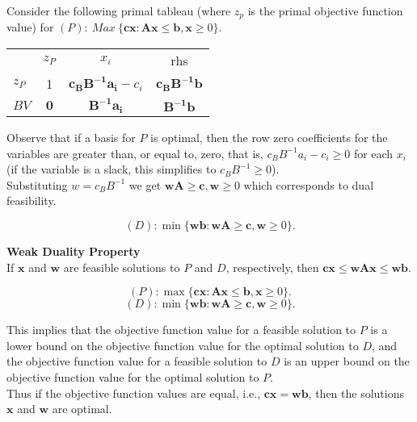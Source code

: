 \vspace{10mm} Consider the following primal tableau (where $z_p$ is the primal objective function value) for $(P):~Max~\{\mathbf{cx}: \mathbf{Ax} \le \mathbf{b}, \mathbf{x} \ge 0\}.$  

\begin{center} \begin{tabular} {l|c|c|c|} \cline{2-4}
		& $z_P$ 			& $x_i$	 						           & rhs \\ \cline{2-4}
$z_P$ 	& 1	   				& $\mathbf{c_BB^{-1}a_i}-c_i$ 	 	& $\mathbf{c_BB^{-1}b}$ \\
$BV$  	& $\mathbf{0}$ 	& $\mathbf{B^{-1}a_i}$   			& $\mathbf{B^{-1}b}$ \\\cline{2-4}
\end{tabular} \end{center} 

Observe that if a basis for $P$ is optimal, then the row zero coefficients for the variables are greater than, or equal to, zero, that is, $c_BB^{-1}a_i-c_i \ge 0$ for each $x_i$ (if the variable is a slack, this simplifies to $c_BB^{-1} \ge 0$). \\

Substituting $w=c_BB^{-1}$ we get $\mathbf{wA} \ge \mathbf{c}, \mathbf{w} \ge 0$ which corresponds to dual feasibility.

$$(D):\min \{\mathbf{wb}: \mathbf{wA} \ge \mathbf{c}, \mathbf{w} \ge 0\}.$$


{\bf Weak Duality Property} \\
If $\mathbf{x}$ and $\mathbf{w}$ are feasible solutions to $P$ and $D$, respectively, then $\mathbf{cx} \le \mathbf{wAx} \le \mathbf{wb}$.

$$(P):\max \{\mathbf{cx}: \mathbf{Ax} \le \mathbf{b}, \mathbf{x} \ge 0\}.$$ 
$$(D):\min \{\mathbf{wb}: \mathbf{wA} \ge \mathbf{c}, \mathbf{w} \ge 0\}.$$

This implies that the objective function value for a feasible solution to $P$ is a lower bound on the objective function value for the optimal solution to $D$, and the objective function value for a feasible solution to $D$ is an upper bound on the objective function value for the optimal solution to $P$. \\

Thus if the objective function values are equal, i.e., $\mathbf{cx} = \mathbf{wb}$, then the solutions $\mathbf{x}$ and $\mathbf{w}$ are optimal. \\

